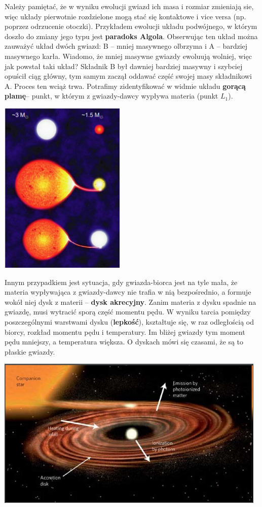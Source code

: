 \documentclass[../index.tex]{subfiles}
\begin{document}
            Należy pamiętać, że w wyniku ewolucji gwiazd ich masa i rozmiar zmieniają sie, więc układy pierwotnie rozdzielone mogą stać się kontaktowe i vice versa (np. poprzez odrzucenie otoczki). Przykładem ewolucji układu podwójnego, w którym doszło do zmiany jego typu jest \textbf{paradoks Algola}. Obserwując ten układ można zauważyć układ dwóch gwiazd: B – mniej masywnego olbrzyma i A – bardziej masywnego karła. Wiadomo, że mniej masywne gwiazdy ewoluują wolniej, więc jak powstał taki układ? Składnik B był dawniej bardziej masywny i szybciej opuścił ciąg główny, tym samym zaczął oddawać część swojej masy składnikowi A. Proces ten wciąż trwa. Potrafimy zidentyfikować w widmie układu \textbf{gorącą plamę}– punkt, w którym z gwiazdy-dawcy wypływa materia (punkt \(L_1\)).
            \begin{center}
                \includegraphics[width=6cm]{images/algol.png}
            \end{center}
            Innym przypadkiem jest sytuacja, gdy gwiazda-biorca jest na tyle mała, że materia wypływająca z gwiazdy-dawcy nie trafia w nią bezpośrednio, a formuje wokół niej dysk z materii – \textbf{dysk akrecyjny}. Zanim materia z dysku spadnie na gwiazdę, musi wytracić sporą część momentu pędu. W wyniku tarcia pomiędzy poszczególnymi warstwami dysku (\textbf{lepkość}), kształtuje się, w raz odległością od biorcy, rozkład momentu pędu i temperatury. Im bliżej gwiazdy tym moment pędu mniejszy, a temperatura większa. O dyskach mówi się czasami, że są to płaskie gwiazdy.
            \begin{center}
                \includegraphics[width=13cm]{images/accretionDisk.png}
            \end{center}
\end{document}

